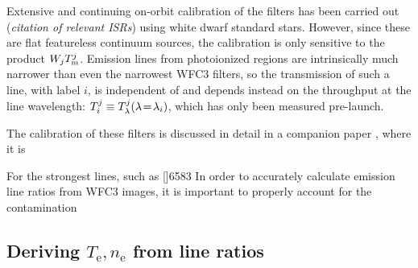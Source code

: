 \documentclass[preprint, 10pt]{aastex}
\newcommand\nii{[\ion{N}{2}]}
\newcommand\elec{\ensuremath{_{\mathrm{e}}}}
\newcommand\Te{\ensuremath{T\elec}}
\newcommand\Ne{\ensuremath{n\elec}}
\begin{document}
Extensive and continuing on-orbit calibration of the filters has been
carried out (\textit{citation of relevant ISRs}) using white dwarf
standard stars.  However, since these are flat featureless continuum
sources, the calibration is only sensitive to the product \(W_j
T_{\mathrm{m}}^{j}\).  Emission lines from photoionized regions are
intrinsically much narrower than even the narrowest WFC3 filters, so
the transmission of such a line, with label \(i\), is independent of
 and depends instead on the throughput at the line wavelength:
\(T_{i}^{j} \equiv T_{\lambda}^{j}(\lambda\!=\!\lambda_i)\), which has only
been measured pre-launch.   


The calibration of these filters
is discussed in detail in a companion paper \citep{Henney:Calib},
where it is 

For the strongest lines, such as
\nii{6583} 
In order to accurately calculate emission line ratios from WFC3
images, it is important to properly account for the contamination 


\subsection{\boldmath Deriving \(\Te, \Ne\) from line ratios}
\label{sec:derive}
\end{document}
